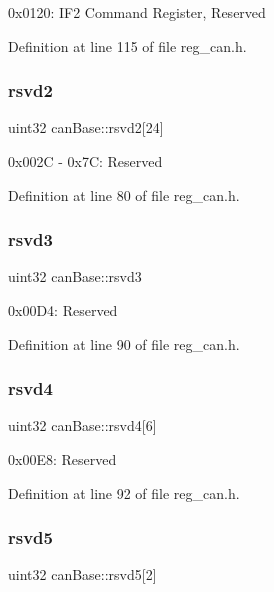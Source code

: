 0x0120\+: I\+F2 Command Register, Reserved 

Definition at line 115 of file reg\+\_\+can.\+h.

\mbox{\label{structcanBase_af47f5ef7e741a1b2808d5eae2f49ef16}} 
\subsubsection{\texorpdfstring{rsvd2}{rsvd2}}
{\footnotesize\ttfamily uint32 can\+Base\+::rsvd2\mbox{[}24\mbox{]}}

0x002C -\/ 0x7C\+: Reserved 

Definition at line 80 of file reg\+\_\+can.\+h.

\mbox{\label{structcanBase_a69048524ce9ea768cbf454115bf854f0}} 
\subsubsection{\texorpdfstring{rsvd3}{rsvd3}}
{\footnotesize\ttfamily uint32 can\+Base\+::rsvd3}

0x00\+D4\+: Reserved 

Definition at line 90 of file reg\+\_\+can.\+h.

\mbox{\label{structcanBase_afc02730a3ec690355c2dd52e4f834caa}} 
\subsubsection{\texorpdfstring{rsvd4}{rsvd4}}
{\footnotesize\ttfamily uint32 can\+Base\+::rsvd4\mbox{[}6\mbox{]}}

0x00\+E8\+: Reserved 

Definition at line 92 of file reg\+\_\+can.\+h.

\mbox{\label{structcanBase_a8a3526d33ede3672507e2fb80f16aa8b}} 
\subsubsection{\texorpdfstring{rsvd5}{rsvd5}}
{\footnotesize\ttfamily uint32 can\+Base\+::rsvd5\mbox{[}2\mbox{]}}

